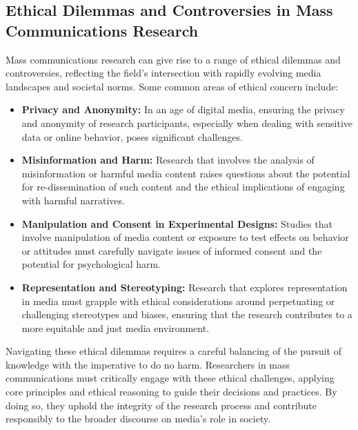 \documentclass[
]{book}
\begin{document}
\hypertarget{ethical-dilemmas-and-controversies-in-mass-communications-research}{%
\subsection*{Ethical Dilemmas and Controversies in Mass Communications Research}\label{ethical-dilemmas-and-controversies-in-mass-communications-research}}

Mass communications research can give rise to a range of ethical dilemmas and controversies, reflecting the field's intersection with rapidly evolving media landscapes and societal norms. Some common areas of ethical concern include:

\begin{itemize}
\item
  \textbf{Privacy and Anonymity:} In an age of digital media, ensuring the privacy and anonymity of research participants, especially when dealing with sensitive data or online behavior, poses significant challenges.
\item
  \textbf{Misinformation and Harm:} Research that involves the analysis of misinformation or harmful media content raises questions about the potential for re-dissemination of such content and the ethical implications of engaging with harmful narratives.
\item
  \textbf{Manipulation and Consent in Experimental Designs:} Studies that involve manipulation of media content or exposure to test effects on behavior or attitudes must carefully navigate issues of informed consent and the potential for psychological harm.
\item
  \textbf{Representation and Stereotyping:} Research that explores representation in media must grapple with ethical considerations around perpetuating or challenging stereotypes and biases, ensuring that the research contributes to a more equitable and just media environment.
\end{itemize}

Navigating these ethical dilemmas requires a careful balancing of the pursuit of knowledge with the imperative to do no harm. Researchers in mass communications must critically engage with these ethical challenges, applying core principles and ethical reasoning to guide their decisions and practices. By doing so, they uphold the integrity of the research process and contribute responsibly to the broader discourse on media's role in society.
\end{document}
